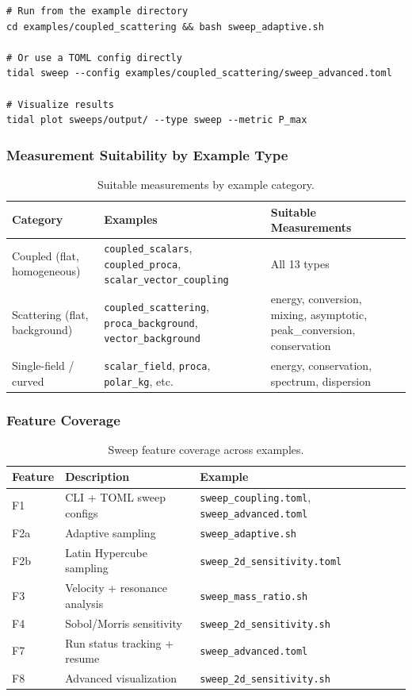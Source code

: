 \begin{lstlisting}[style=bash]
# Run from the example directory
cd examples/coupled_scattering && bash sweep_adaptive.sh

# Or use a TOML config directly
tidal sweep --config examples/coupled_scattering/sweep_advanced.toml

# Visualize results
tidal plot sweeps/output/ --type sweep --metric P_max
\end{lstlisting}

\subsubsection{Measurement Suitability by Example Type}

\begin{table}[htbp]
\centering
\caption{Suitable measurements by example category.}
\label{tab:measurement-suitability}
\begin{tabular}{@{}lp{3.5cm}p{6cm}@{}}
\toprule
Category & Examples & Suitable Measurements \\
\midrule
Coupled (flat, homogeneous) & \texttt{coupled\_scalars}, \texttt{coupled\_proca}, \texttt{scalar\_vector\_coupling} & All 13 types \\
Scattering (flat, background) & \texttt{coupled\_scattering}, \texttt{proca\_background}, \texttt{vector\_background} & energy, conversion, mixing, asymptotic, peak\_conversion, conservation \\
Single-field / curved & \texttt{scalar\_field}, \texttt{proca}, \texttt{polar\_kg}, etc. & energy, conservation, spectrum, dispersion \\
\bottomrule
\end{tabular}
\end{table}

\subsubsection{Feature Coverage}

\begin{table}[htbp]
\centering
\caption{Sweep feature coverage across examples.}
\label{tab:feature-coverage}
\begin{tabular}{@{}lll@{}}
\toprule
Feature & Description & Example \\
\midrule
F1  & CLI + TOML sweep configs       & \texttt{sweep\_coupling.toml}, \texttt{sweep\_advanced.toml} \\
F2a & Adaptive sampling              & \texttt{sweep\_adaptive.sh} \\
F2b & Latin Hypercube sampling       & \texttt{sweep\_2d\_sensitivity.toml} \\
F3  & Velocity + resonance analysis  & \texttt{sweep\_mass\_ratio.sh} \\
F4  & Sobol/Morris sensitivity       & \texttt{sweep\_2d\_sensitivity.sh} \\
F7  & Run status tracking + resume   & \texttt{sweep\_advanced.toml} \\
F8  & Advanced visualization         & \texttt{sweep\_2d\_sensitivity.sh} \\
\bottomrule
\end{tabular}
\end{table}

